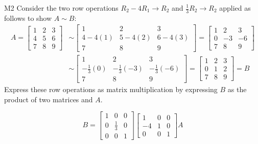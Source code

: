 \begin{problem}{M2}
Consider the two row operations 
\(R_2-4R_1\to R_2\) and \(\frac{1}{3}R_2\to R_2\)
applied as follows to show \(A\sim B\):
\begin{align*}
A
  =
\begin{bmatrix}
1&2&3\\
4&5&6\\
7&8&9
\end{bmatrix}
  &\sim
\begin{bmatrix}
1&2&3\\
4-4(1)&5-4(2)&6-4(3)\\
7&8&9
\end{bmatrix}
  =
\begin{bmatrix}
1&2&3\\
0&-3&-6\\
7&8&9
\end{bmatrix}
  \\&\sim
\begin{bmatrix}
1&2&3\\
-\frac{1}{3}(0)&-\frac{1}{3}(-3)&-\frac{1}{3}(-6)\\
7&8&9
\end{bmatrix}
  =
\begin{bmatrix}
1&2&3\\
0&1&2\\
7&8&9
\end{bmatrix}
  = 
B
\end{align*}
Express these row operations as matrix multiplication
by expressing \(B\) as the product of two matrices and \(A\).
\end{problem}
\begin{solution}
\[
B
  =
\begin{bmatrix}
  1&0&0\\
  0&\frac{1}{3}&0\\
  0&0&1
\end{bmatrix}
\begin{bmatrix}
  1&0&0\\
  -4&1&0\\
  0&0&1
\end{bmatrix}
A
\]
\end{solution}


